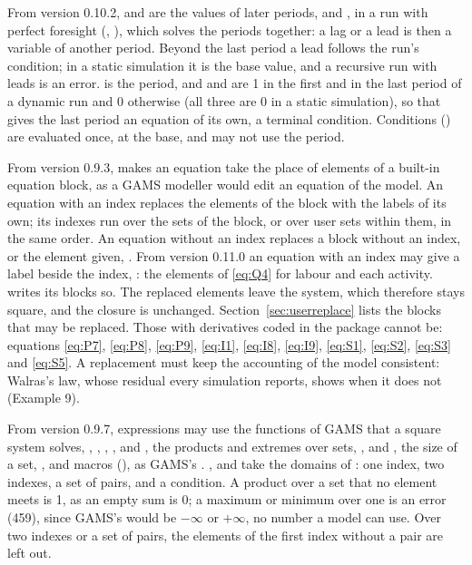 From version 0.10.2, \cmd{)} and
\cmd{(}\cmd{),} \cmd{)} are the values of
later periods,  and \cmd{)}, in
a run with perfect foresight (, ), which
solves the periods together: a lag or a lead is then a variable of another
period. Beyond the last period a lead follows the run's 
condition; in a static simulation it is the base value, and a recursive run
with leads is an error.  is the period, and  and
 are 1 in the first and in the last period of a dynamic run and 0
otherwise (all three are 0 in a static simulation), so that
\cmd{, }\cmd{)} gives the last period an
equation of its own, a terminal condition. Conditions (\cmd{\$}) are
evaluated once, at the base, and may not use the period.


From version 0.9.3, \cmd{)} makes an equation take
the place of elements of a built-in equation block, as a GAMS modeller would
edit an equation of the model. An equation with an index replaces the elements
of the block with the labels of its own; its indexes run over the sets of the
block, or over user sets within them, in the same order. An equation without an
index replaces a block without an index, or the element given,
\cmd{(}\cmd{))}. From version 0.11.0 an
equation with an index may give a label beside the index,
: the elements of \eqref{eq:Q4} for labour and each
activity.  writes its blocks so. The replaced elements leave the
system, which therefore stays square, and the closure is unchanged.
Section~\ref{sec:userreplace} lists the blocks that may be replaced. Those
with derivatives coded in the package cannot be: equations \eqref{eq:P7},
\eqref{eq:P8}, \eqref{eq:P9}, \eqref{eq:I1}, \eqref{eq:I8}, \eqref{eq:I9},
\eqref{eq:S1}, \eqref{eq:S2}, \eqref{eq:S3} and \eqref{eq:S5}. A replacement must keep the accounting of
the model consistent: Walras's law, whose residual  every
simulation reports, shows when it does not (Example 9).


From version 0.9.7, expressions may use the functions of GAMS that a square
system solves, , , , ,
 and , the products and extremes over sets,
,  and , the size of a set, ,
and macros (), as GAMS's . ,
 and  take the domains of : one index, two
indexes, a set of pairs, and a condition. A product over a set that no element
meets is 1, as an empty sum is 0; a maximum or minimum over one is an error
(459), since GAMS's would be $-\infty$ or $+\infty$, no number a model can
use. Over two indexes or a set of pairs, the elements of the first index
without a pair are left out.

